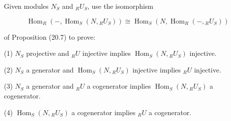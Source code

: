 Given modules $N_S$ and ${}_R U_S$, use the isomorphism

$$\operatorname{Hom}_R(-, \operatorname{Hom}_S(N, {}_R U_S)) \cong \operatorname{Hom}_S(N, \operatorname{Hom}_R(-, {}_R U_S))$$

of Proposition (20.7) to prove:

(1) $N_S$ projective and ${}_R U$ injective implies $\operatorname{Hom}_S(N, {}_R U_S)$ injective.

(2) $N_S$ a generator and $\operatorname{Hom}_S(N, {}_R U_S)$ injective implies ${}_R U$ injective.

(3) $N_S$ a generator and ${}_R U$ a cogenerator implies $\operatorname{Hom}_S(N, {}_R U_S)$ a cogenerator.

(4) $\operatorname{Hom}_S(N, {}_R U_S)$ a cogenerator implies ${}_R U$ a cogenerator.
